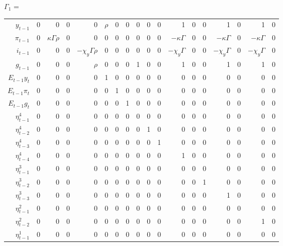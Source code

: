 \documentclass[]{article}
\begin{document}
$ \Gamma_1 $ = 
\begin{tabular}{r|rrrrrrrrrrrrrrrrr}
	$ y_{t-1} $ & 0 & 0 & 0 & 0 & $ \rho $ & 0 & 0 & 0 & 0 & 0 & 1 & 0 & 0 & 1 & 0 & 1 & 0 \\
	$  \pi_{t-1} $ &0  & $ \kappa\Gamma \rho $ & 0 & 0 & 0 &  0 & 0 & 0 & 0 & 0 & $ -\kappa\Gamma $ & 0 & 0 &  $ -\kappa\Gamma $ & 0 &  $ -\kappa\Gamma $ & 0 \\
	$ i_{t-1} $ & 0 & 0 & 0 & $ -\chi_y\Gamma\rho $ & 0 & 0 & 0 & 0 & 0 & 0 & $ -\chi_y\Gamma $ & 0 & 0 & $ -\chi_y\Gamma $ & 0 & $ -\chi_y\Gamma $ & 0 \\
	$ g_{t-1} $ & 0 & 0 & 0 & $ \rho $ & 0 & 0 & 0 & 1 & 0 & 0 & 1 & 0 & 0 & 1 & 0 & 1 & 0 \\
	$ E_{t-1}y_{t} $    & 0 & 0 & 0 & 0 & 1 & 0 & 0 & 0 & 0 & 0 & 0 & 0 & 0 & 0 & 0 & 0 & 0 \\
	$ E_{t-1}\pi_{t}  $ & 0 & 0 & 0 & 0 & 0 & 1 & 0 & 0 & 0 & 0 & 0 & 0 & 0 & 0 & 0 & 0 & 0 \\
	$ E_{t-1} g_{t} $   & 0 & 0 & 0 & 0 & 0 & 0 & 1 & 0 & 0 & 0 & 0 & 0 & 0 & 0 & 0 & 0 & 0 \\
	$ \eta_{t-1}^4 $    & 0 & 0 & 0 & 0 & 0 & 0 & 0 & 0 & 0 & 0 & 0 & 0 & 0 & 0 & 0 & 0 & 0 \\
	$ \eta_{t-2}^4 $    & 0 & 0 & 0 & 0 & 0 & 0 & 0 & 0 & 1 & 0 & 0 & 0 & 0 & 0 & 0 & 0 & 0 \\
	$ \eta_{t-3}^4 $    & 0 & 0 & 0 & 0 & 0 & 0 & 0 & 0 & 0 & 1 & 0 & 0 & 0 & 0 & 0 & 0 & 0 \\
	$ \eta_{t-4}^4 $    & 0 & 0 & 0 & 0 & 0 & 0 & 0 & 0 & 0 & 0 & 1 & 0 & 0 & 0 & 0 & 0 & 0 \\
	$ \eta_{t-1}^3 $    & 0 & 0 & 0 & 0 & 0 & 0 & 0 & 0 & 0 & 0 & 0 & 0 & 0 & 0 & 0 & 0 & 0 \\
	$ \eta_{t-2}^3 $    & 0 & 0 & 0 & 0 & 0 & 0 & 0 & 0 & 0 & 0 & 0 & 0 & 1 & 0 & 0 & 0 & 0 \\
	$ \eta_{t-3}^3 $    & 0 & 0 & 0 & 0 & 0 & 0 & 0 & 0 & 0 & 0 & 0 & 0 & 0 & 1 & 0 & 0 & 0 \\
	$ \eta_{t-1}^2 $    & 0 & 0 & 0 & 0 & 0 & 0 & 0 & 0 & 0 & 0 & 0 & 0 & 0 & 0 & 0 & 0 & 0 \\
	$ \eta_{t-2}^2 $    & 0 & 0 & 0 & 0 & 0 & 0 & 0 & 0 & 0 & 0 & 0 & 0 & 0 & 0 & 0 & 1 & 0 \\
	$ \eta_{t-1}^1 $    & 0 & 0 & 0 & 0 & 0 & 0 & 0 & 0 & 0 & 0 & 0 & 0 & 0 & 0 & 0 & 0 & 0 \\
\end{tabular}	\\
\end{document}
